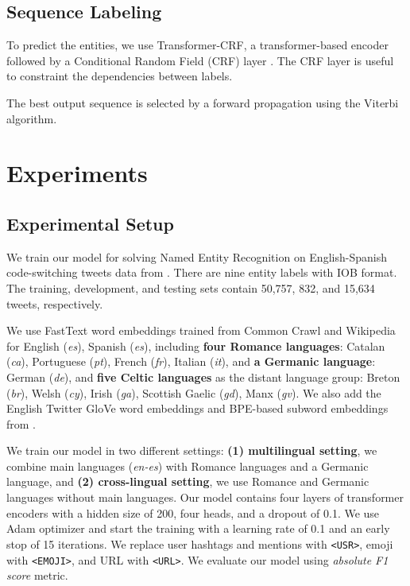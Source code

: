 \documentclass[11pt,a4paper]{article}
\begin{document}
\subsection{Sequence Labeling}
To predict the entities, we use Transformer-CRF, a transformer-based encoder followed by a Conditional Random Field (CRF) layer \cite{Lafferty2001ConditionalRF}. 
The CRF layer is useful to constraint the dependencies between labels.

The best output sequence is selected by a forward propagation using the Viterbi algorithm.

\section{Experiments}
\subsection{Experimental Setup}
We train our model for solving Named Entity Recognition on English-Spanish code-switching tweets data from \citet{W18-3219}. There are nine entity labels with IOB format. The training, development, and testing sets contain 50,757, 832, and 15,634 tweets, respectively. 

We use FastText word embeddings trained from Common Crawl and Wikipedia \cite{grave2018learning} for English (\textit{es}), Spanish (\textit{es}), including \textbf{four Romance languages}: Catalan (\textit{ca}), Portuguese (\textit{pt}), French (\textit{fr}), Italian (\textit{it}), and \textbf{a Germanic language}: German (\textit{de}), and \textbf{five Celtic languages} as the distant language group: Breton (\textit{br}), Welsh (\textit{cy}), Irish (\textit{ga}), Scottish Gaelic (\textit{gd}), Manx (\textit{gv}). We also add the English Twitter GloVe word embeddings \cite{pennington2014glove} and BPE-based subword embeddings from \citet{heinzerling2018bpemb}. 

We train our model in two different settings: \textbf{(1) multilingual setting}, we combine main languages (\textit{en-es}) with Romance languages and a Germanic language, and \textbf{(2) cross-lingual setting}, we use Romance and Germanic languages without main languages. Our model contains four layers of transformer encoders with a hidden size of 200, four heads, and a dropout of 0.1. We use Adam optimizer and start the training with a learning rate of 0.1 and an early stop of 15 iterations. We replace user hashtags and mentions with \texttt{<USR>}, emoji with \texttt{<EMOJI>}, and URL with \texttt{<URL>}. We evaluate our model using \textit{absolute F1 score} metric.
\end{document}

